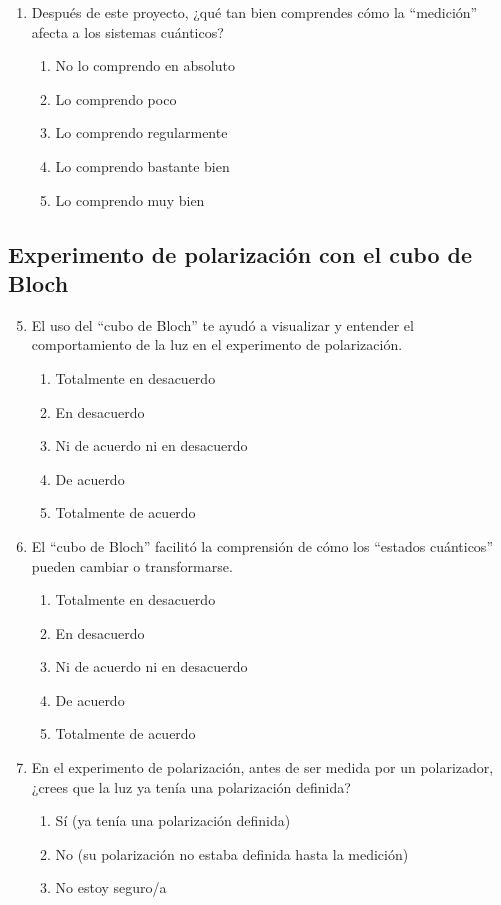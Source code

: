 \documentclass[10pt,a4paper]{article}
\begin{document}
\begin{enumerate}
    \item Después de este proyecto, ¿qué tan bien comprendes cómo la ``medición'' afecta a los sistemas cuánticos?
    \begin{enumerate}[label=\alph*)]
        \item No lo comprendo en absoluto
        \item Lo comprendo poco
        \item Lo comprendo regularmente
        \item Lo comprendo bastante bien
        \item Lo comprendo muy bien
    \end{enumerate}
\end{enumerate}

\subsection{Experimento de polarización con el cubo de Bloch}
\begin{enumerate}
    \setcounter{enumi}{4} %
    \item El uso del ``cubo de Bloch'' te ayudó a visualizar y entender el comportamiento de la luz en el experimento de polarización.
    \begin{enumerate}[label=\alph*)]
        \item Totalmente en desacuerdo
        \item En desacuerdo
        \item Ni de acuerdo ni en desacuerdo
        \item De acuerdo
        \item Totalmente de acuerdo
    \end{enumerate}
    
    \item El ``cubo de Bloch'' facilitó la comprensión de cómo los ``estados cuánticos'' pueden cambiar o transformarse.
    \begin{enumerate}[label=\alph*)]
        \item Totalmente en desacuerdo
        \item En desacuerdo
        \item Ni de acuerdo ni en desacuerdo
        \item De acuerdo
        \item Totalmente de acuerdo
    \end{enumerate}
    
    \item En el experimento de polarización, antes de ser medida por un polarizador, ¿crees que la luz ya tenía una polarización definida?
    \begin{enumerate}[label=\alph*)]
        \item Sí (ya tenía una polarización definida)
        \item No (su polarización no estaba definida hasta la medición)
        \item No estoy seguro/a
    \end{enumerate}
\end{enumerate}
\end{document}
